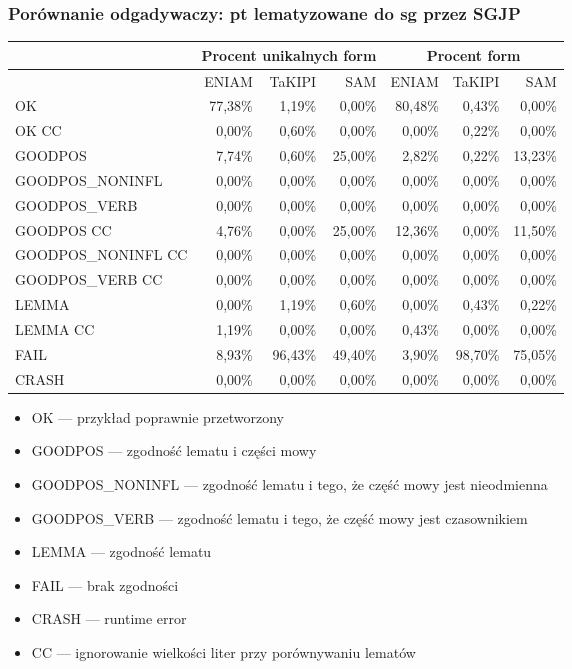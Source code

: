 \documentclass{beamer}
\begin{document}
\begin{frame}
\frametitle{Porównanie odgadywaczy: pt lematyzowane do sg przez SGJP}
\begin{center}\begin{scriptsize}
\begin{tabular}{l|rrr|rrr}
& \multicolumn{3}{c|}{Procent unikalnych form} &
\multicolumn{3}{c}{Procent form} \\
\hline
& ENIAM & TaKIPI & SAM & ENIAM & TaKIPI & SAM \\
\hline
OK & 77,38\% & 1,19\% & 0,00\% & 80,48\% & 0,43\% & 0,00\% \\
OK CC & 0,00\% & 0,60\% & 0,00\% & 0,00\% & 0,22\% & 0,00\% \\
GOODPOS & 7,74\% & 0,60\% & 25,00\% & 2,82\% & 0,22\% & 13,23\% \\
GOODPOS\_NONINFL & 0,00\% & 0,00\% & 0,00\% & 0,00\% & 0,00\% & 0,00\% \\
GOODPOS\_VERB & 0,00\% & 0,00\% & 0,00\% & 0,00\% & 0,00\% & 0,00\% \\
GOODPOS CC & 4,76\% & 0,00\% & 25,00\% & 12,36\% & 0,00\% & 11,50\% \\
GOODPOS\_NONINFL CC & 0,00\% & 0,00\% & 0,00\% & 0,00\% & 0,00\% & 0,00\% \\
GOODPOS\_VERB CC & 0,00\% & 0,00\% & 0,00\% & 0,00\% & 0,00\% & 0,00\% \\
LEMMA & 0,00\% & 1,19\% & 0,60\% & 0,00\% & 0,43\% & 0,22\% \\
LEMMA CC & 1,19\% & 0,00\% & 0,00\% & 0,43\% & 0,00\% & 0,00\% \\
FAIL & 8,93\% & 96,43\% & 49,40\% & 3,90\% & 98,70\% & 75,05\% \\
CRASH & 0,00\% & 0,00\% & 0,00\% & 0,00\% & 0,00\% & 0,00\% \\
\end{tabular}
\end{scriptsize}\end{center}
\begin{scriptsize}\begin{itemize}
\item OK --- przykład poprawnie przetworzony
\item GOODPOS --- zgodność lematu i części mowy
\item GOODPOS\_NONINFL --- zgodność lematu i tego, że część mowy jest nieodmienna
\item GOODPOS\_VERB --- zgodność lematu i tego, że część mowy jest czasownikiem
\item LEMMA --- zgodność lematu
\item FAIL --- brak zgodności
\item CRASH --- runtime error
\item CC --- ignorowanie wielkości liter przy porównywaniu lematów
\end{itemize}\end{scriptsize}
\end{frame}
\end{document}
